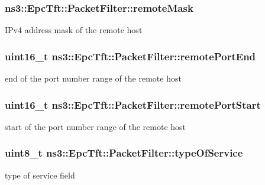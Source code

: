 \subsubsection[{\texorpdfstring{remote\+Mask}{remoteMask}}]{ ns3\+::\+Epc\+Tft\+::\+Packet\+Filter\+::remote\+Mask}\hypertarget{structns3_1_1EpcTft_1_1PacketFilter_a776b963c9555b388893c5aaab0856afb}{}\label{structns3_1_1EpcTft_1_1PacketFilter_a776b963c9555b388893c5aaab0856afb}
I\+Pv4 address mask of the remote host 
\subsubsection[{\texorpdfstring{remote\+Port\+End}{remotePortEnd}}]{\setlength{\rightskip}{0pt plus 5cm}uint16\+\_\+t ns3\+::\+Epc\+Tft\+::\+Packet\+Filter\+::remote\+Port\+End}\hypertarget{structns3_1_1EpcTft_1_1PacketFilter_a4bcdd15a9526e27eabd474276f691cf1}{}\label{structns3_1_1EpcTft_1_1PacketFilter_a4bcdd15a9526e27eabd474276f691cf1}
end of the port number range of the remote host 
\subsubsection[{\texorpdfstring{remote\+Port\+Start}{remotePortStart}}]{\setlength{\rightskip}{0pt plus 5cm}uint16\+\_\+t ns3\+::\+Epc\+Tft\+::\+Packet\+Filter\+::remote\+Port\+Start}\hypertarget{structns3_1_1EpcTft_1_1PacketFilter_aa96ab9356c91b14059220d00155c32b5}{}\label{structns3_1_1EpcTft_1_1PacketFilter_aa96ab9356c91b14059220d00155c32b5}
start of the port number range of the remote host 
\subsubsection[{\texorpdfstring{type\+Of\+Service}{typeOfService}}]{\setlength{\rightskip}{0pt plus 5cm}uint8\+\_\+t ns3\+::\+Epc\+Tft\+::\+Packet\+Filter\+::type\+Of\+Service}\hypertarget{structns3_1_1EpcTft_1_1PacketFilter_abd62754182d9af89f6bc5fdc51a609ae}{}\label{structns3_1_1EpcTft_1_1PacketFilter_abd62754182d9af89f6bc5fdc51a609ae}
type of service field 
